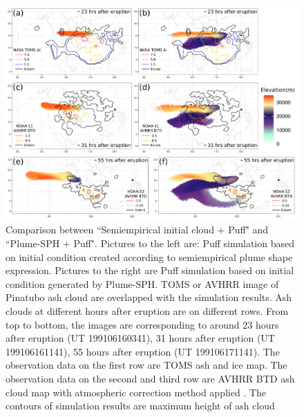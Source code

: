 \documentclass[utf8]{frontiersSCNS} %
\begin{document}
\begin{figure}[!htb]
\centering
\includegraphics[width=0.99 \textwidth]{Figures/bent_plume-maximum-height}
\caption{Comparison between ``Semiempirical initial cloud + Puff" and ``Plume-SPH + Puff". Pictures to the left are: Puff simulation based on initial condition created according to semiempirical plume shape expression. Pictures to the right are Puff simulation based on initial condition generated by Plume-SPH. TOMS or AVHRR image of Pinatubo ash cloud are overlapped with the simulation results. Ash clouds at different hours after eruption are on different rows. From top to bottom, the images are corresponding to around 23 hours after eruption (UT 199106160341), 31 hours after eruption (UT 199106161141), 55 hours after eruption (UT 199106171141). The observation data on the first row are TOMS ash and ice map. The observation data on the second and third row are AVHRR BTD ash cloud map with atmospheric correction method applied \citep{guo2004particles}. The contours of simulation results are maximum height of ash cloud}
\label{fig:Plume-SPH-Puff-ash-cloud-max-height}
\end{figure}
\end{document}
